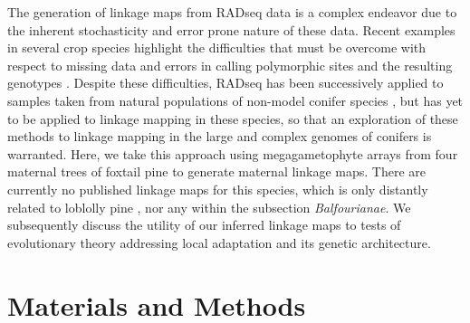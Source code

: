 \documentclass[smallextended]{svjour3}
\begin{document}
The generation of linkage maps from RADseq data is a complex endeavor due to the inherent stochasticity
and error prone nature of these data. Recent examples in several crop species highlight the
difficulties that must be overcome with respect to missing data and errors in calling polymorphic sites 
and the resulting genotypes \citep{Pfender:2011, Ward:2013}. Despite these difficulties, RADseq has been 
successively applied to samples taken from natural populations of non-model conifer species \citep{Parchman:2012}, but has yet 
to be applied to linkage mapping in these species, so that an exploration of these methods to linkage mapping in the large and complex 
genomes of conifers is warranted. Here, we take this approach using megagametophyte arrays from four maternal trees of foxtail pine
to generate maternal linkage maps. There are currently no published linkage 
maps for this species, which is only distantly related to loblolly pine \citep{Eckert:2006a}, nor any within the subsection \textit{Balfourianae}. 
We subsequently discuss the utility of our inferred linkage maps to tests of evolutionary theory addressing local adaptation 
and its genetic architecture.


\section*{Materials and Methods}\label{ss:mats}
\end{document}
